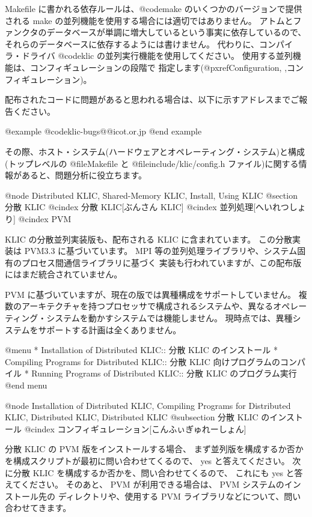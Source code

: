 {{{{Makefile に書かれる依存ルールは、@code{make} のいくつかのバージョンで提供される make の並列機能を使用する場合には適切ではありません。
アトムとファンクタのデータベースが単調に増大しているという事実に依存しているので、それらのデータベースに依存するようには書けません。
代わりに、コンパイラ・ドライバ @code{klic} の並列実行機能を使用してください。
使用する並列機能は、コンフィギュレーションの段階で
指定します(@pxref{Configuration, ,コンフィギュレーション})。

配布されたコードに問題があると思われる場合は、以下に示すアドレスまでご報告ください。

@example
@code{klic-bugs@@icot.or.jp}
@end example

その際、ホスト・システム(ハードウェアとオペレーティング・システム)と構成(トップレベルの @file{Makefile} と @file{include/klic/config.h} ファイル)に関する情報があると、問題分析に役立ちます。

@node Distributed KLIC, Shared-Memory KLIC, Install, Using KLIC
@section 分散 KLIC
@cindex 分散 KLIC[ぶんさん KLIC]
@cindex 並列処理[へいれつしょり]
@cindex PVM

KLIC の分散並列実装版も、配布される KLIC に含まれています。
この分散実装は PVM3.3 に基づいています。
 MPI 等の並列処理ライブラリや、システム固有のプロセス間通信ライブラリに基づく
実装も行われていますが、この配布版にはまだ統合されていません。

PVM に基づいていますが、現在の版では異種構成をサポートしていません。
複数のアーキテクチャを持つプロセッサで構成されるシステムや、異なるオペレーティング・システムを動かすシステムでは機能しません。
現時点では、異種システムをサポートする計画は全くありません。

@menu
* Installation of Distributed KLIC::        分散 KLIC のインストール
* Compiling Programs for Distributed KLIC:: 分散 KLIC 向けプログラムのコンパイル
* Running Programs of Distributed KLIC::    分散 KLIC のプログラム実行
@end menu

@node Installation of Distributed KLIC, Compiling Programs for Distributed KLIC, Distributed KLIC, Distributed KLIC
@subsection 分散 KLIC のインストール
@cindex コンフィギュレーション[こんふぃぎゅれーしょん]

分散 KLIC の PVM 版をインストールする場合、
まず並列版を構成するか否かを構成スクリプトが最初に問い合わせてくるので、
 yes と答えてください。
次に分散 KLIC を構成するか否かを、問い合わせてくるので、
これにも yes と答えてください。
そのあと、 PVM が利用できる場合は、 PVM システムのインストール先の
ディレクトリや、使用する PVM ライブラリなどについて、問い合わせてきます。

}}}}

